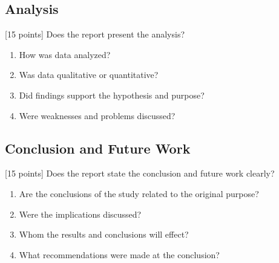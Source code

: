 \documentclass{winslabreport}
\begin{document}
\subsection{Analysis}
[15 points] Does the report present the analysis?
\begin{enumerate}
\item How was data analyzed?
\item Was data qualitative or quantitative?
\item Did findings support the hypothesis and purpose?
\item Were weaknesses and problems discussed?
\end{enumerate}

\subsection{Conclusion and Future Work}
[15 points] Does the report state the conclusion and future work clearly?
\begin{enumerate}
\item Are the conclusions of the study related to the original purpose?
\item Were the implications discussed?
\item Whom the results and conclusions will effect?
\item What recommendations were made at the conclusion?
\end{enumerate}
\end{document}
